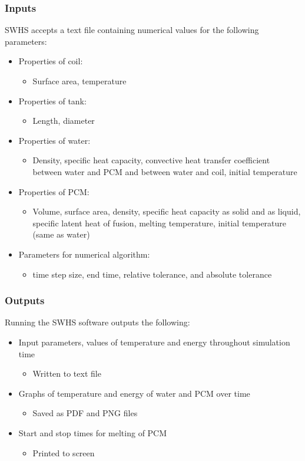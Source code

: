 \documentclass{beamer}
\begin{document}
\begin{frame}
	\frametitle{Inputs}
	SWHS accepts a text file containing numerical values for the following parameters:
	\begin{itemize}
	\item Properties of coil:
	\begin{itemize}
	\item Surface area, temperature
	\end{itemize}
	\item Properties of tank:
	\begin{itemize}
	\item Length, diameter
	\end{itemize}
	\item Properties of water:
	\begin{itemize}
	\item Density, specific heat capacity, convective heat transfer coefficient between water and PCM and between water and coil, initial temperature
	\end{itemize}
	\item Properties of PCM:
	\begin{itemize}
	\item Volume, surface area, density, specific heat capacity as solid and as liquid, specific latent heat of fusion, melting temperature, initial temperature (same as water)
	\end{itemize}
	\item Parameters for numerical algorithm:
	\begin{itemize}
	\item time step size, end time, relative tolerance, and absolute tolerance
	\end{itemize}
	\end{itemize}
\end{frame}
	
\begin{frame}
	\frametitle{Outputs}
	Running the SWHS software outputs the following:
	\begin{itemize}
	\item Input parameters, values of temperature and energy throughout simulation time
	\begin{itemize}
	\item Written to text file
	\end{itemize}
	\item Graphs of temperature and energy of water and PCM over time
	\begin{itemize}
	\item Saved as PDF and PNG files
	\end{itemize}
	\item Start and stop times for melting of PCM
	\begin{itemize}
	\item Printed to screen
	\end{itemize}
	\end{itemize}
\end{frame}
	
\end{document}
